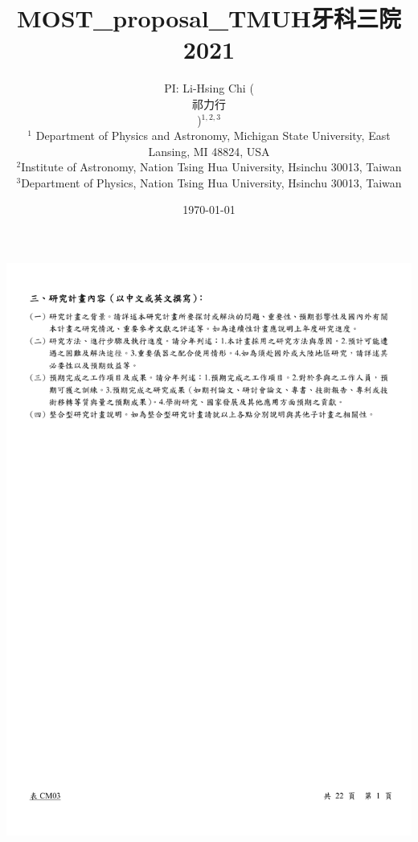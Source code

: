 \documentclass[12pt, a4paper]{article}
\newcommand{\cntext}[1]{\begin{CJK*}{UTF8}{bkai}#1\end{CJK*}}
\begin{document}
\includegraphics[trim=1.5cm 0 0 3cm]{cover.pdf}
\thispagestyle{titlepage}

\clearpage
\title{\Large \vspace{-2.5cm} MOST_proposal_TMUH牙科三院2021}

\author{\small PI: Li-Hsing Chi (\cntext{祁力行})$^{1,2,3}$\\
{\footnotesize $^1$ Department of Physics and Astronomy, Michigan State University, East Lansing, MI 48824, USA}\\
{\footnotesize $^2$Institute of Astronomy, Nation Tsing Hua University, Hsinchu 30013, Taiwan}\\ 
{\footnotesize $^3$Department of Physics, Nation Tsing Hua University, Hsinchu 30013, Taiwan}}
\date{\small \today}


\maketitle
\end{document}
